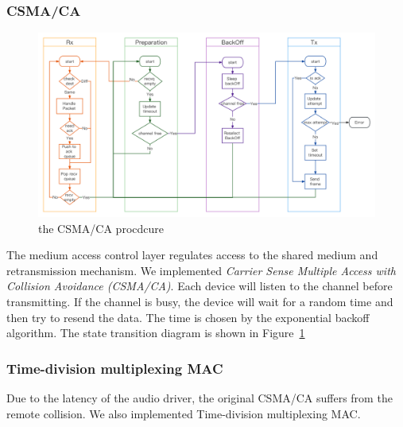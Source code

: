 \subsubsection{CSMA/CA}
\begin{figure}[h]
	\begin{center}
		\centerline{\includegraphics[width=\columnwidth]{./figures/CSMA.png}}
		\caption{the CSMA/CA procdcure}
		\label{csma}
	\end{center}
\end{figure}
The medium access control layer regulates access to the shared medium and retransmission mechanism. We implemented \emph{Carrier Sense Multiple Access with Collision Avoidance (CSMA/CA)}. Each device will listen to the channel before transmitting. If the channel is busy, the device will wait for a random time and then try to resend the data. The time is chosen by the exponential backoff algorithm. The state transition diagram is shown in Figure~\ref{csma}

\subsubsection{Time-division multiplexing MAC}
Due to the latency of the audio driver, the original CSMA/CA suffers from the remote collision. We also implemented Time-division multiplexing MAC.

